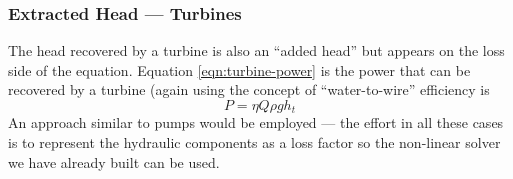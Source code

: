 \subsubsection{Extracted Head --- Turbines}
The head recovered by a turbine is also an ``added head'' but appears on the loss side of the equation.   Equation \ref{eqn:turbine-power} is the power that can be recovered by a turbine (again using the concept of ``water-to-wire'' efficiency is 
\begin{equation}
P=\eta Q\rho g h_t
\label{eqn:turbine-power}
\end{equation}
An approach similar to pumps would be employed --- the effort in all these cases is to represent the hydraulic components as a loss factor so the non-linear solver we have already built can be used.  

%
%
%
%
%
